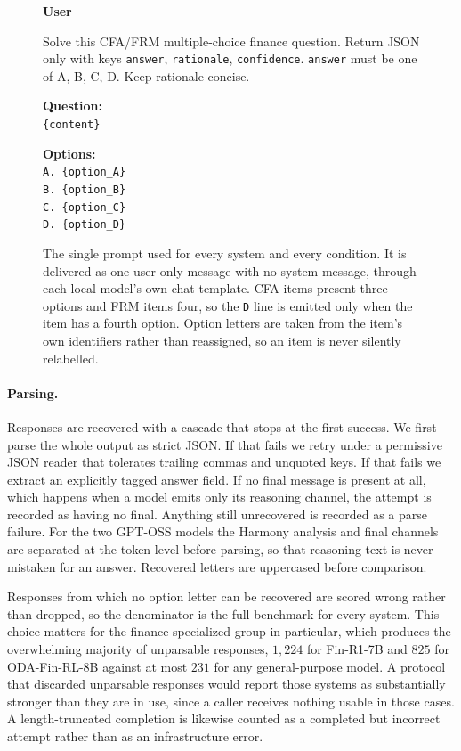 \begin{figure}[htbp]
\centering
\begin{promptbox}
\textbf{User}

\vspace{0.5em}
Solve this CFA/FRM multiple-choice finance question. Return JSON only with keys
\texttt{answer}, \texttt{rationale}, \texttt{confidence}. \texttt{answer} must be one of
A, B, C, D. Keep rationale concise.

\vspace{0.8em}
\textbf{Question:} \\
\texttt{\{content\}}

\vspace{0.5em}
\textbf{Options:} \\
\texttt{A. \{option\_A\}} \\
\texttt{B. \{option\_B\}} \\
\texttt{C. \{option\_C\}} \\
\texttt{D. \{option\_D\}}
\end{promptbox}
\caption{The single prompt used for every system and every condition. It is delivered as one
user-only message with no system message, through each local model's own chat template. CFA
items present three options and FRM items four, so the \texttt{D} line is emitted only when the
item has a fourth option. Option letters are taken from the item's own identifiers rather than
reassigned, so an item is never silently relabelled.}
\label{fig:prompt-mcq}
\end{figure}

\paragraph{Parsing.}
Responses are recovered with a cascade that stops at the first success. We first parse the whole
output as strict JSON. If that fails we retry under a permissive JSON reader that tolerates
trailing commas and unquoted keys. If that fails we extract an explicitly tagged answer field. If
no final message is present at all, which happens when a model emits only its reasoning channel,
the attempt is recorded as having no final. Anything still unrecovered is recorded as a parse
failure. For the two GPT-OSS models the Harmony analysis and final channels are separated at the
token level before parsing, so that reasoning text is never mistaken for an answer. Recovered
letters are uppercased before comparison.

Responses from which no option letter can be recovered are scored wrong rather than dropped, so
the denominator is the full benchmark for every system. This choice matters for the
finance-specialized group in particular, which produces the overwhelming majority of unparsable
responses, $1{,}224$ for Fin-R1-7B and $825$ for ODA-Fin-RL-8B against at most $231$ for any
general-purpose model. A protocol that discarded unparsable responses would report those systems
as substantially stronger than they are in use, since a caller receives nothing usable in those
cases. A length-truncated completion is likewise counted as a completed but incorrect attempt
rather than as an infrastructure error.

